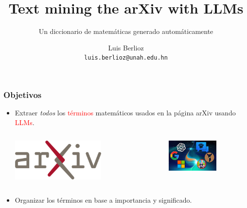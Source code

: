 \documentclass[10pt]{beamer}
\title{Text mining the arXiv with LLMs}
\subtitle{Un diccionario de matemáticas generado automáticamente}
\author{Luis Berlioz\\
\texttt{luis.berlioz@unah.edu.hn}}
\institute{Universidad Nacional Autónoma de Honduras}
\newcommand{\arxiv}{arXiv}
\begin{document}
\begin{frame}
\titlepage
\end{frame}


\begin{frame}
    \frametitle{Objetivos}
    \begin{itemize}
        \item Extraer \emph{todos} los \textcolor<2>{red}{términos} matemáticos usados en la página \arxiv{} usando \textcolor<3>{red}{LLMs}.
            \begin{columns}
                \begin{column}{0.5\textwidth}
            \begin{center}
                \includegraphics[width=0.6\textwidth]{../Images/ArXiv_logo_2022.svg.png}
            \end{center}
        \end{column}
        \begin{column}{0.5\textwidth}
            \begin{center}
                \includegraphics[width=0.6\textwidth]{../Images/all_llm_logos.jpeg}
            \end{center}

        \end{column}
    \end{columns}
        \item Organizar los términos en base a importancia y significado.  
    \end{itemize}
\end{frame}
\end{document}
